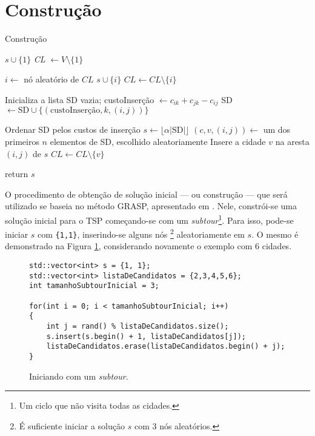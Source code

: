 \section{Construção}

\begin{algorithm}
\caption{Construção}\label{euclid}
\begin{algorithmic}[1]
\State $ s \cup \{1\} $
\State \textit{CL} $\gets V \setminus \{1\}$  

 
\State $i \gets$ nó aleatório de $CL$
\State $s \cup \{i\}$ 
\State $CL \gets CL \setminus \{i\}$
\EndFor

\State Inicializa a lista SD vazia; 
        \State custoInserção $\gets c_{ik} + c_{jk} - c_{ij}$
        \State SD $\gets \text{SD} \cup \{(\text{custoInserção}, k, (i, j))\}$
    \EndFor
\EndFor

\State Ordenar SD pelos custos de inserção
\State $s \gets \lfloor\alpha |\text{SD}|\rfloor$
\State $(c, v, (i,j)) \gets $ um dos primeiros $n$ elementos de SD, escolhido aleatoriamente
\State Insere a cidade $v$ na aresta $(i,j)$ de $s$
\State $CL \gets CL \setminus \{v\}$
\EndWhile

\State return $s$
\EndProcedure
\end{algorithmic}
\label{CONSTRUCAOD-ALG}
\end{algorithm}
    

O procedimento de obtenção de solução inicial --- ou construção --- que será utilizado se baseia no método GRASP, apresentado em \cite{MARCONE2011}. Nele, constrói-se uma solução inicial para o TSP começando-se com um \textit{subtour}\footnote{Um ciclo que não visita todas as cidades.}. Para isso, pode-se iniciar \(s\) com \texttt{\{1,1\}}, inserindo-se alguns nós \footnote{É suficiente iniciar a solução \(s\) com 3 nós aleatórios.} aleatoriamente em \(s\). O mesmo é demonstrado na Figura \ref{fig:3}, considerando novamente o exemplo com 6 cidades.

\begin{figure}
    \centering
    
    \begin{lstlisting}
std::vector<int> s = {1, 1};
std::vector<int> listaDeCandidatos = {2,3,4,5,6};
int tamanhoSubtourInicial = 3;
        
for(int i = 0; i < tamanhoSubtourInicial; i++)
{
    int j = rand() % listaDeCandidatos.size();
    s.insert(s.begin() + 1, listaDeCandidatos[j]);
    listaDeCandidatos.erase(listaDeCandidatos.begin() + j);
}
    \end{lstlisting}

    \caption{Iniciando com um \textit{subtour}.}
    \label{fig:3}
\end{figure}

